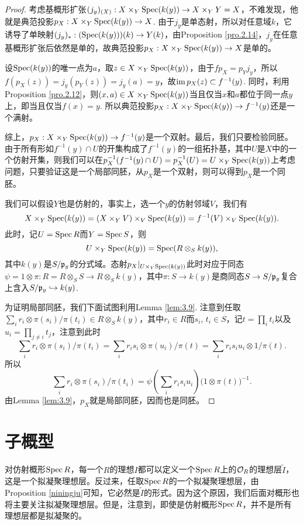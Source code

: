 \begin{proof}
考虑基概形扩张$(j_y)_{(X)}:X\times_Y \operatorname{Spec} (k(y))\to X\times_Y Y=X$，不难发现，他就是典范投影$p_X:X\times_Y \operatorname{Spec} (k(y))\to X$. 由于$j_y$是单态射，所以对任意域$k$，它诱导了单映射$(j_y)_*:(\operatorname{Spec} (k(y)))(k)\to Y(k)$，由Proposition \ref{pro.2.14}，$j_y$在任意基概形扩张后依然是单的，故典范投影$p_X:X\times_Y \operatorname{Spec} (k(y))\to X$是单的。

设$\operatorname{Spec}(k(y))$的唯一点为$a$，取$z\in X\times_Y \operatorname{Spec} (k(y))$，由于$fp_X=p_Yj_y$，所以$f(p_X(z))=j_y(p_Y(z))=j_y(a)=y$，故$\operatorname{im} p_X(z)\subset f^{-1}(y)$. 同时，利用Proposition \ref{pro.2.12}，则$(x,a)\in X\times_Y\operatorname{Spec} (k(y))$当且仅当$x$和$a$都位于同一点$y$上，即当且仅当$f(x)=y$. 所以典范投影$p_X:X\times_Y \operatorname{Spec} (k(y))\to f^{-1}(y)$还是一个满射。

综上，$p_X:X\times_Y \operatorname{Spec} (k(y))\to f^{-1}(y)$是一个双射。最后，我们只要检验同胚。由于所有形如$f^{-1}(y)\cap U$的开集构成了$f^{-1}(y)$的一组拓扑基，其中$U$是$X$中的一个仿射开集，则我们可以在$p_X^{-1}(f^{-1}(y)\cap U)=p_X^{-1}(U)=U \times_Y \operatorname{Spec} (k(y))$上考虑问题，只要验证这是一个局部同胚，从$p_X$是一个双射，则可以得到$p_X$是一个同胚。

我们可以假设$Y$也是仿射的，事实上，选一个$y$的仿射邻域$V$，我们有
\[
	X\times_Y \operatorname{Spec} (k(y))=(X\times_Y V)\times_V \operatorname{Spec} (k(y))=f^{-1}(V)\times_V \operatorname{Spec} (k(y)).
\]
此时，记$U=\operatorname{Spec} R$而$Y=\operatorname{Spec} S$，则
\[
	U \times_Y \operatorname{Spec} (k(y))=\operatorname{Spec} (R\otimes_S k(y)),
\]
其中$k(y)$是$S/\mathfrak{p}_y$的分式域。态射$p_X|_{U \times_Y \operatorname{Spec} (k(y))}$此时对应于同态$\psi=1\otimes \pi:R=R\otimes_S S\to R\otimes_S k(y)$，其中$\pi:S\to k(y)$是商同态$S\to S/\mathfrak{p}_y$复合上含入$S/\mathfrak{p}_y\hookrightarrow k(y)$.

为证明局部同胚，我们下面试图利用Lemma \ref{lem:3.9}. 注意到任取$\sum_i r_i \otimes \pi(s_i)/\pi(t_i)\in R\otimes_S k(y)$，其中$r_i\in R$而$s_i$, $t_i\in S$，记$t=\prod_i t_i$以及$u_i=\prod_{j\neq i}t_j$，注意到此时
\[
	\sum_i r_i \otimes \pi(s_i)/\pi(t_i)=\sum_i r_is_i \otimes \pi(u_i)/\pi(t)=\sum_i r_is_iu_i \otimes 1/\pi(t).
\]
所以
\[
	\sum_i r_i \otimes \pi(s_i)/\pi(t_i)=\psi\left(\sum_i r_is_iu_i\right)\bigl(1\otimes \pi(t)\bigr)^{-1}.
\]
由Lemma \ref{lem:3.9}，$p_X$就是局部同胚，因而也是同胚。
\end{proof}

\section{子概型}

对仿射概形$\operatorname{Spec} R$，每一个$R$的理想$I$都可以定义一个$\operatorname{Spec} R$上的$\mathcal{O}_R$的理想层$\widetilde{I}$，这是一个拟凝聚理想层。反过来，任取$\operatorname{Spec} R$的一个拟凝聚理想层，由Proposition \ref{niningju}可知，它必然是$\widetilde{I}$的形式。因为这个原因，我们后面对概形也将主要关注拟凝聚理想层。但是，注意到，即使是仿射概形$\operatorname{Spec} R$，并不是所有理想层都是拟凝聚的。

